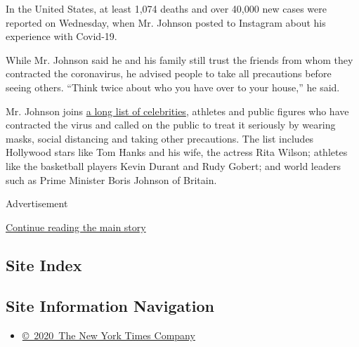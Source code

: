In the United States, at least 1,074 deaths and over 40,000 new cases
were reported on Wednesday, when Mr. Johnson posted to Instagram about
his experience with Covid-19.

While Mr. Johnson said he and his family still trust the friends from
whom they contracted the coronavirus, he advised people to take all
precautions before seeing others. ``Think twice about who you have over
to your house,'' he said.

Mr. Johnson joins
\href{https://www.nytimes3xbfgragh.onion/article/coronavirus-celebrities-actors-politicians.html}{a
long list of celebrities}, athletes and public figures who have
contracted the virus and called on the public to treat it seriously by
wearing masks, social distancing and taking other precautions. The list
includes Hollywood stars like Tom Hanks and his wife, the actress Rita
Wilson; athletes like the basketball players Kevin Durant and Rudy
Gobert; and world leaders such as Prime Minister Boris Johnson of
Britain.

Advertisement

\protect\hyperlink{after-bottom}{Continue reading the main story}

\hypertarget{site-index}{%
\subsection{Site Index}\label{site-index}}

\hypertarget{site-information-navigation}{%
\subsection{Site Information
Navigation}\label{site-information-navigation}}

\begin{itemize}
\tightlist
\item
  \href{https://help.nytimes3xbfgragh.onion/hc/en-us/articles/115014792127-Copyright-notice}{©~2020~The
  New York Times Company}
\end{itemize}

